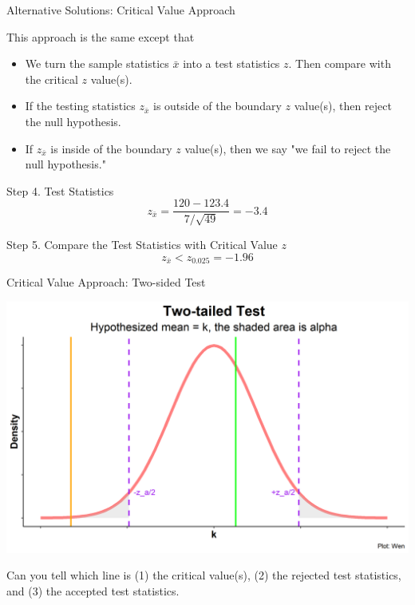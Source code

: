 \documentclass{beamer}
\begin{document}
\begin{frame}{Alternative Solutions: Critical Value Approach}

This approach is the same except that 
\begin{itemize}
\item We turn the sample statistics $\bar{x}$ into a test statistics $z$. Then compare with the critical $z$ value(s).
\item If the testing statistics $z_{\bar{x}}$ is outside of the boundary $z$ value(s), then reject the null hypothesis.
\item If $z_{\bar{x}}$ is inside of the boundary $z$ value(s), then we say "we fail to reject the null hypothesis."
\end{itemize}

\vspace{0.3 cm}
Step 4. Test Statistics
$$ z_{\bar{x}} = \frac{120 - 123.4}{7/\sqrt{49}} = -3.4$$

Step 5. Compare the Test Statistics with Critical Value $z$
$$ z_{\bar{x}} < z_{0.025} = -1.96$$

\end{frame}


\begin{frame}{Critical Value Approach: Two-sided Test}

\begin{center}
\includegraphics[scale=0.5]{images/HypothesisTestingTwoSided.png}
\end{center}

Can you tell which line is (1) the critical value(s), (2) the rejected test statistics, and (3) the accepted test statistics.

\end{frame}
\end{document}
